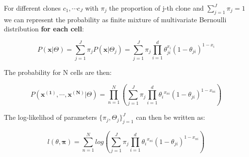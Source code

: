 \documentclass[pdf, aspectratio=169]{beamer}
\begin{document}
\begin{frame}
	For different clones $c_1, \cdots c_J$ with $\pi_j$ the proportion of j-th clone and $\sum_{j=1}^J \pi_j = 1$ we can represent the probability as finite mixture of multivariate Bernoulli distribution \textbf{for each cell}:
	
	$$P(\mathbf{x}|\Theta) = \sum_{j=1}^{J} \pi_j P(\mathbf{x} | \Theta_j) = \sum_{j=1}^{J} \pi_j \prod_{i=1}^{d} \theta_{ji}^{x_i}(1 - \theta_{ji})^{1 - x_i}$$
	
	The probability for N cells are then:
	
	$$P(\mathbf{x^{(1)}, \cdots, x^{(N)}}|\Theta) = \prod_{n=1}^{N} (\sum_{j=1}^{J} \pi_j \prod_{i=1}^{d} {\theta_i}^{x_{ni}}(1 - \theta_{ji})^{1 - x_{ni}} )$$	
	
	The log-likelihod of parameters $\{\pi_j, \Theta_j\}_{j=1}^{J}$ can then be written as:
	
	$$l(\theta, \mathbf{\pi}) = \sum_{n=1}^{N} log( \sum_{j=1}^{J} \pi_j \prod_{i=1}^{d} {\theta_i}^{x_{ni}}(1 - \theta_{ji})^{1 - x_{ni}})$$
\end{frame}
\end{document}
